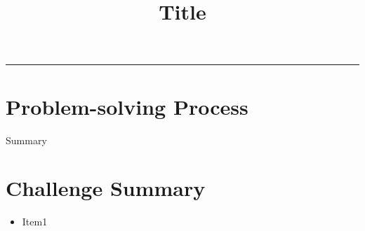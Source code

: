 \documentclass[11pt]{article}
\title{Title}
\makeatletter
\renewcommand{\maketitle}{%
  \begin{flushleft}
    {\LARGE\bfseries \@title}
  \end{flushleft}
  \vspace{1em}
}
\makeatother
\begin{document}
\maketitle

\hrule

\section*{Problem-solving Process}
Summary

\section*{Challenge Summary}
\begin{itemize}[leftmargin=*]
  \item Item1
\end{itemize}
\end{document}
